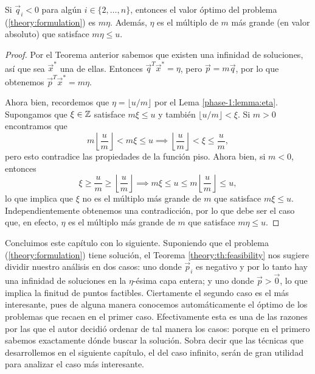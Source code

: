\begin{corollary}
	Si $\vec{q}_i < 0$ para algún $i \in \lbrace 2, \ldots, n \rbrace$, entonces el valor óptimo del
	problema (\ref{theory:formulation}) es $m\eta$. Además, $\eta$ es el múltiplo de $m$ más grande
	(en valor absoluto) que satisface $m\eta \leq u$.
\end{corollary}
\begin{proof}
	Por el Teorema anterior sabemos que existen una infinidad de soluciones, así que sea $\vec{x}^*$
	una de ellas. Entonces $\vec{q}^T\vec{x}^* = \eta$, pero $\vec{p} = m\vec{q}$, por lo que
	obtenemos $\vec{p}^T\vec{x}^* = m\eta$.

	Ahora bien, recordemos que $\eta = \lfloor u/m \rfloor$ por el Lema \ref{phase-1:lemma:eta}.
	Supongamos que $\xi \in \mathbb{Z}$ satisface $m\xi \leq u$ y también $\lfloor u/m \rfloor < \xi$. Si $m
	> 0$ encontramos que
	\begin{equation*}
		m\left\lfloor \frac{u}{m} \right\rfloor < m\xi \leq u
		\implies \left\lfloor \frac{u}{m} \right\rfloor < \xi \leq \frac{u}{m},
	\end{equation*}
	pero esto contradice las propiedades de la función piso. Ahora bien, si $m < 0$, entonces
	\begin{equation*}
		\xi \geq \frac{u}{m} \geq \left\lfloor \frac{u}{m} \right\rfloor
		\implies m\xi \leq u \leq m \left\lfloor \frac{u}{m} \right\rfloor \leq u,
	\end{equation*}
	lo que implica que $\xi$ no es el múltiplo más grande de $m$ que satisface $m\xi \leq u$.
	Independientemente obtenemos una contradicción, por lo que debe ser el caso que, en efecto,
	$\eta$ es el múltiplo más grande de $m$ que satisface $m\eta \leq u$.
\end{proof}

Concluimos este capítulo con lo siguiente. Suponiendo que el problema (\ref{theory:formulation})
tiene solución, el Teorema \ref{theory:th:feasibility} nos sugiere dividir nuestro análisis en dos
casos: uno donde $\vec{p}_i$ es negativo y por lo tanto hay una infinidad de soluciones en la
$\eta$-ésima capa entera; y uno donde $\vec{p} > \vec{0}$, lo que implica la finitud de puntos
factibles. Ciertamente el segundo caso es el más interesante, pues de alguna manera conocemos
automáticamente el óptimo de los problemas que recaen en el primer caso. Efectivamente esta es una
de las razones por las que el autor decidió ordenar de tal manera los casos: porque en el primero
sabemos exactamente dónde buscar la solución. Sobra decir que las técnicas que desarrollemos en el
siguiente capítulo, el del caso infinito, serán de gran utilidad para analizar el caso más
interesante.
